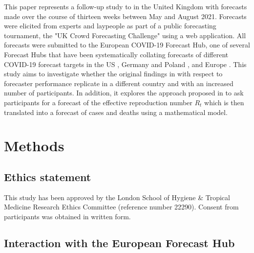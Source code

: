 \documentclass[10pt,a4paper,twocolumn]{article}
\begin{document}
This paper represents a follow-up study to \citet{bosseComparingHumanModelbased2022} in the United Kingdom with forecasts made over the course of thirteen weeks between May and August 2021. Forecasts were elicited from experts and laypeople as part of a public forecasting tournament, the "UK Crowd Forecasting Challenge" using a web application. All forecasts were submitted to the European COVID-19 Forecast Hub, one of several Forecast Hubs that have been systematically collating forecasts of different COVID-19 forecast targets in the US \citep{cramerEvaluationIndividualEnsemble2021}, Germany and Poland \citep{bracherShorttermForecastingCOVID192021, bracherNationalSubnationalShortterm2021}, and Europe \citep{sherrattPredictivePerformanceMultimodel2022a}. This study aims to investigate whether the original findings in \citet{bosseComparingHumanModelbased2022} with respect to forecaster performance replicate in a different country and with an increased number of participants. In addition, it explores the approach proposed in \citet{bosseComparingHumanModelbased2022} to ask participants for a forecast of the effective reproduction number $R_t$ which is then translated into a forecast of cases and deaths using a mathematical model. 


\section*{Methods}

\subsection*{Ethics statement}
This study has been approved by the London School of Hygiene \& Tropical Medicine Research Ethics Committee (reference number 22290). Consent from participants was obtained in written form.

\subsection*{Interaction with the European Forecast Hub}
\end{document}
